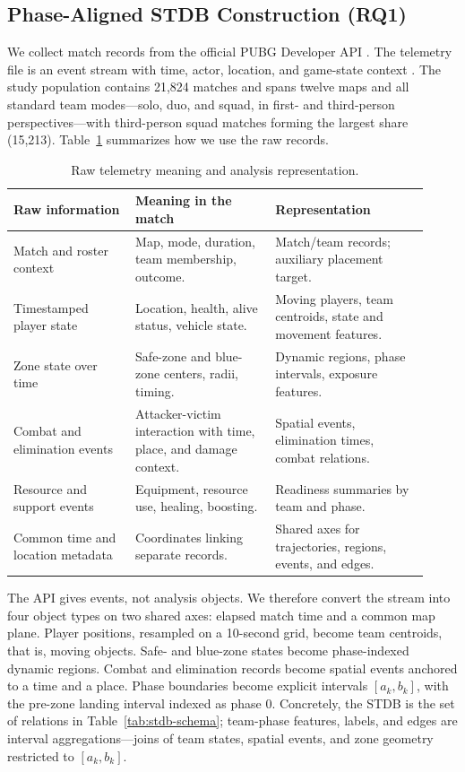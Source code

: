 \subsection{Phase-Aligned STDB Construction (RQ1)}
\label{sec:methods-data}

We collect match records from the official PUBG Developer API
\cite{pubgDeveloperPortal,pubgTelemetryGuide}. The telemetry file is an event
stream with time, actor, location, and game-state context
\cite{pubgTelemetryEvents,pubgTelemetryObjects}. The study population contains
21,824 matches and spans twelve maps and all standard team modes---solo, duo,
and squad, in first- and third-person perspectives---with third-person squad
matches forming the largest share (15,213). Table~\ref{tab:api-fields}
summarizes how we use the raw records.

\begin{table}[t]
\centering
\caption{Raw telemetry meaning and analysis representation.}
\label{tab:api-fields}
\small
\begin{tabular}{p{0.27\linewidth}p{0.31\linewidth}p{0.34\linewidth}}
\toprule
Raw information & Meaning in the match & Representation \\
\midrule
Match and roster context & Map, mode, duration, team membership, outcome. &
Match/team records; auxiliary placement target. \\
Timestamped player state & Location, health, alive status, vehicle state. &
Moving players, team centroids, state and movement features. \\
Zone state over time & Safe-zone and blue-zone centers, radii, timing. &
Dynamic regions, phase intervals, exposure features. \\
Combat and elimination events & Attacker-victim interaction with time, place,
and damage context. & Spatial events, elimination times, combat relations. \\
Resource and support events & Equipment, resource use, healing, boosting. &
Readiness summaries by team and phase. \\
Common time and location metadata & Coordinates linking separate records. &
Shared axes for trajectories, regions, events, and edges. \\
\bottomrule
\end{tabular}
\end{table}

The API gives events, not analysis objects. We therefore convert the stream
into four object types on two shared axes: elapsed match time and a common map
plane. Player positions, resampled on a 10-second grid, become team centroids,
that is, moving objects. Safe- and blue-zone states become phase-indexed
dynamic regions. Combat and elimination records become spatial events anchored
to a time and a place. Phase boundaries become explicit intervals
\([a_k,b_k]\), with the pre-zone landing interval indexed as phase 0.
Concretely, the STDB is the set of relations in
Table~\ref{tab:stdb-schema}; team-phase features, labels, and edges are
interval aggregations---joins of team states, spatial events, and zone
geometry restricted to \([a_k,b_k]\).

